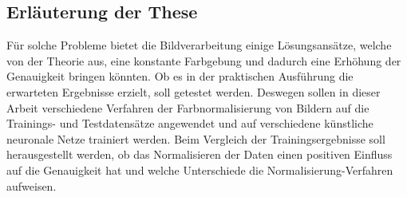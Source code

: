 \documentclass[a4paper,12pt,oneside]{article}
\begin{document}
  \subsection{Erläuterung der These}\label{s.these}
Für solche Probleme bietet die Bildverarbeitung einige Lösungsansätze, welche von der Theorie aus, eine konstante Farbgebung und dadurch eine Erhöhung der Genauigkeit bringen könnten. Ob es in der praktischen Ausführung die erwarteten Ergebnisse erzielt, soll getestet werden. Deswegen sollen in dieser Arbeit verschiedene Verfahren der Farbnormalisierung von Bildern auf die Trainings- und Testdatensätze angewendet und auf verschiedene künstliche neuronale Netze trainiert werden. Beim Vergleich der Trainingsergebnisse soll herausgestellt werden, ob das Normalisieren der Daten einen positiven Einfluss auf die Genauigkeit hat und welche Unterschiede die Normalisierung-Verfahren aufweisen.\\
\end{document}
